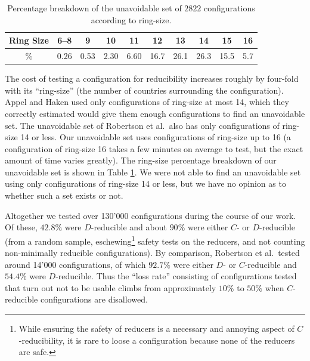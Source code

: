 \documentclass[11pt]{article}
\newcommand{\nc}{{$2822$ }}
\begin{document}
\begin{table}\label{ringsize}
\begin{center}
\begin{tabular}{|c|c|c|c|c|c|c|c|c|c|}
\hline
Ring Size & 6--8 & 9 & 10 & 11 & 12 & 13 & 14 & 15 & 16 \\ 
\hline
\% & 0.26 & 0.53 & 2.30 & 6.60 & 16.7 & 26.1 & 26.3 & 15.5 & 5.7 \\ 
\hline
\end{tabular}
\end{center}
\caption{Percentage breakdown of the unavoidable set of \nc configurations according to ring-size.}
\end{table}

The cost of testing a configuration for reducibility increases roughly by four-fold with its ``ring-size'' (the number of countries surrounding the configuration). Appel and Haken used only configurations of ring-size at most 14, which they correctly estimated would give them enough configurations to find an unavoidable set. The unavoidable set of Robertson et al.~also has only configurations of ring-size 14 or less. Our unavoidable set uses configurations of ring-size up to 16 (a configuration of ring-size 16 takes a few minutes on average to test, but the exact amount of time varies greatly). The ring-size percentage breakdown of our unavoidable set is shown in Table \ref{ringsize}. We were not able to find an unavoidable set using only configurations of ring-size 14 or less, but we have no opinion as to whether such a set exists or not.

Altogether we tested over 130'000 configurations during the course of our work. Of these, $42.8\%$ were $D$-reducible and about $90\%$ were either $C$- or $D$-reducible (from a random sample, eschewing\footnote{While ensuring the safety of reducers is a necessary and annoying aspect of $C$-reducibility, it is rare to loose a configuration because none of the reducers are safe.} safety tests on the reducers, and not counting non-minimally reducible configurations). By comparison, Robertson et al.~tested around 14'000 configurations, of which $92.7\%$ were either $D$- or $C$-reducible and $54.4\%$ were $D$-reducible. Thus the ``loss rate'' consisting of configurations tested that turn out not to be usable climbs from approximately $10\%$ to $50\%$ when $C$-reducible configurations are disallowed.
\end{document}
